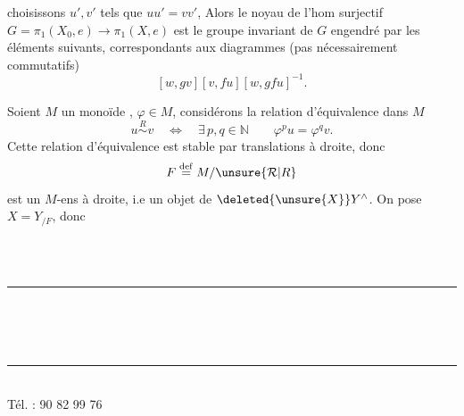 
choisissons $u',v'$  tels que $uu'=vv'$,  Alors le noyau de l'hom surjectif $G=\pi_1(X_0,e)\longrightarrow\pi_1(X,e)$ est le groupe invariant de $G$ engendré par les éléments suivants, correspondants aux diagrammes (pas nécessairement commutatifs)
\[
[w,gv][v,fu][w,gfu]^{-1}.
\]

Soient $M$ un monoïde ,  $\varphi\in M$, considérons la relation d'équivalence  dans $M$
\[
u\overset{R}{\sim}v\quad\Longleftrightarrow\quad\exists\,p,q\in\mathbb N\qquad\varphi^p u=\varphi^q v.
\]
Cette relation d'équivalence est stable par translations à droite, donc
\[
F\overset{\mathrm{def}}{=}M/\unsure{\mathcal R|R}
\]
est un $M$-ens à droite, i.e un objet de $\deleted{\unsure{X}}Y^\wedge$. On pose $X=Y_{/F}$, donc
\par\smallskip
{\footnotesize\noindent\begin{minipage}[t]{.46\linewidth}\raggedright
{}\\ \\ \rule{2.6em}{.3pt}\\ \\ \\ \rule{2.6em}{.3pt}\\ Tél. : 90 82 99 76\\ 
\end{minipage}\hfill%
\begin{minipage}[t]{.51\linewidth}\raggedright
{}\\ \\ \\ \\ 
\end{minipage}\par}

